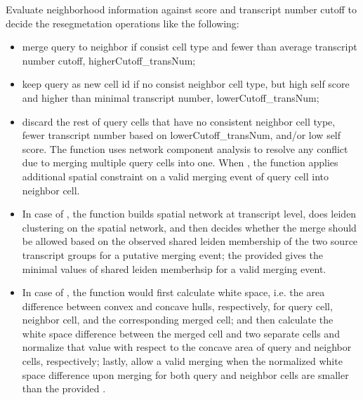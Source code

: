 \documentclass[letterpaper]{book}
\begin{document}
\begin{Details}
Evaluate neighborhood information against score and transcript number cutoff to decide the resegmetation operations like the following:
\begin{itemize}

\item{} merge query to neighbor if consist cell type and fewer than average transcript number cutoff, higherCutoff\_transNum;
\item{} keep query as new cell id if no consist neighbor cell type, but high self score and higher than minimal transcript number, lowerCutoff\_transNum;
\item{} discard the rest of query cells that have no consistent neighbor cell type, fewer transcript number based on lowerCutoff\_transNum, and/or low self score.
The function uses network component analysis to resolve any conflict due to merging multiple query cells into one.
When , the function applies additional spatial constraint on a valid merging event of query cell into neighbor cell.
\item{} In case of , the function builds spatial network at transcript level, does leiden clustering  on the spatial network, and then decides whether the merge should be allowed based on the observed shared leiden membership of the two source transcript groups for a putative merging event; the provided  gives the minimal values of shared leiden memberhsip for a valid merging event.
\item{} In case of , the function would first calculate white space, i.e. the area difference between convex and concave hulls, respectively, for query cell, neighbor cell, and the corresponding merged cell; and then calculate the white space difference between the merged cell and two separate cells and normalize that value with respect to the concave area of query and neighbor cells, respectively; lastly, allow a valid merging when the normalized white space difference upon merging for both query and neighbor cells are smaller than the provided .

\end{itemize}

\end{Details}
%
\end{document}
